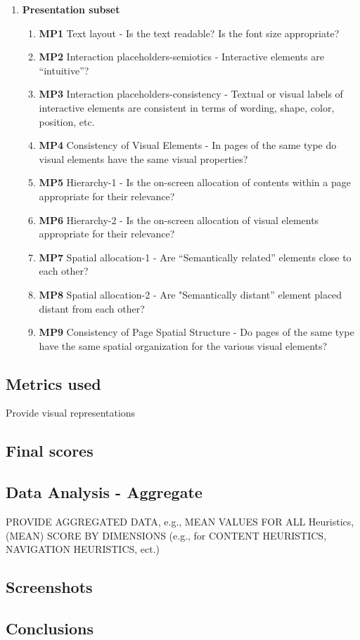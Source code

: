 \begin{enumerate}
	\item \textbf{Presentation subset}
		\begin{enumerate}
			\item \textbf{MP1} Text layout - Is the text readable? Is the font size appropriate?
			\item \textbf{MP2} Interaction placeholders-semiotics - Interactive elements are “intuitive”?
			\item \textbf{MP3} Interaction placeholders-consistency - Textual or visual labels of interactive elements are consistent in terms of wording, shape, color, position, etc.
			\item \textbf{MP4} Consistency of Visual Elements - In pages of the same type do visual elements have the same visual properties?
			\item \textbf{MP5} Hierarchy-1 - Is the on-screen allocation of contents within a page appropriate for their relevance?
			\item \textbf{MP6} Hierarchy-2 - Is the on-screen allocation of visual elements appropriate for their relevance?
			\item \textbf{MP7} Spatial allocation-1 - Are “Semantically related” elements close to each other?
			\item \textbf{MP8} Spatial allocation-2 - Are "Semantically distant” element placed distant from each other?
			\item \textbf{MP9} Consistency of Page Spatial Structure - Do pages of the same type have the same spatial organization for the various visual elements?
		\end{enumerate}
\end{enumerate}

\subsection{Metrics used}
Provide visual representations

\subsection{Final scores}

\subsection{Data Analysis - Aggregate}
PROVIDE AGGREGATED DATA, e.g., MEAN VALUES FOR ALL Heuristics,
(MEAN) SCORE BY DIMENSIONS (e.g., for CONTENT HEURISTICS,
NAVIGATION HEURISTICS, ect.)

\subsection{Screenshots}

\subsection{Conclusions}

